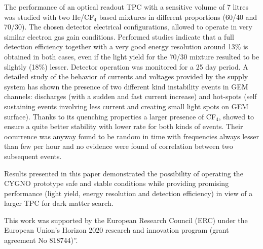 \documentclass[a4paper,11pt]{article}
\begin{document}
The performance of an optical readout TPC with a sensitive volume of 7 litres was studied with two He/CF$_4$ based mixtures in different proportions (60/40 and 70/30).
The chosen detector electrical configurations, allowed to operate in very similar electron gas gain conditions.
Performed studies indicate that a full detection efficiency together with a very good energy resolution around 13\% is obtained in both cases,
even if the light yield for the 70/30 mixture resulted to be slightly (18\%) lesser.
Detector operation was monitored for a 25 day period. A detailed study of the behavior of currents and voltages provided by the supply system has shown the presence of two different kind instability events in GEM channels: discharges (with a sudden and fast current increase) and hot-spots (self sustaining events involving less current and creating small light spots on GEM surface).
Thanks to its quenching properties a larger presence of CF$_4$, showed to ensure a quite better stability with lower rate for both kinds of events.
Their occurrence was anyway found to be random in time with frequencies always lesser than few per hour and no evidence were found of correlation between two subsequent events.

Results presented in this paper demonstrated the possibility of operating the CYGNO prototype safe and stable conditions while providing promising performance (light yield, energy resolution and detection efficiency) in view of a larger TPC for dark matter search. 

\acknowledgments 
This work was supported by the European Research Council (ERC) under the European Union’s Horizon 2020 research and innovation program (grant agreement No 818744)”.



\end{document}
